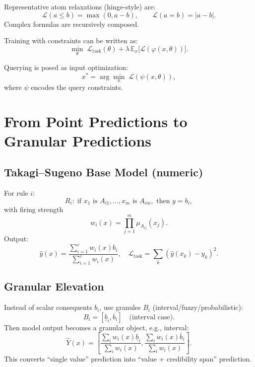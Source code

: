 ﻿\documentclass[11pt,a4paper]{article}
\begin{document}
Representative atom relaxations (hinge-style) are:
\begin{equation}
\mathcal{L}(a \le b)=\max(0,a-b), \qquad
\mathcal{L}(a=b)=|a-b|.
\label{eq:atom_relax}
\end{equation}
Complex formulas are recursively composed.

Training with constraints can be written as:
\begin{equation}
\min_{\theta} \; \mathcal{L}_{\text{task}}(\theta)
+ \lambda\,\mathbb{E}_{x}\big[\mathcal{L}(\varphi(x,\theta))\big].
\label{eq:dl2_train}
\end{equation}

Querying is posed as input optimization:
\begin{equation}
x^{\ast}=\arg\min_{x}\;\mathcal{L}(\psi(x,\theta)),
\label{eq:dl2_query}
\end{equation}
where $\psi$ encodes the query constraints.

\section{From Point Predictions to Granular Predictions}

\subsection{Takagi--Sugeno Base Model (numeric)}
For rule $i$:
\begin{equation}
R_i:\; \text{if }x_1\text{ is }A_{i1},\dots,x_m\text{ is }A_{im},\text{ then } y=b_i,
\label{eq:ts_rule}
\end{equation}
with firing strength
\begin{equation}
w_i(x)=\prod_{j=1}^{m}\mu_{A_{ij}}(x_j).
\label{eq:firing}
\end{equation}
Output:
\begin{equation}
\hat y(x)=\frac{\sum_{i=1}^{c} w_i(x)b_i}{\sum_{i=1}^{c}w_i(x)},
\quad
\mathcal{L}_{\text{task}}=\sum_{k}(\hat y(x_k)-y_k)^2.
\label{eq:ts_output}
\end{equation}

\subsection{Granular Elevation}
Instead of scalar consequents $b_i$, use granules $B_i$ (interval/fuzzy/probabilistic):
\begin{equation}
B_i = [\underline b_i,\overline b_i] \quad \text{(interval case)}.
\label{eq:interval_consequent}
\end{equation}
Then model output becomes a granular object, e.g., interval:
\begin{equation}
\hat Y(x)=\left[
\frac{\sum_i w_i(x)\underline b_i}{\sum_i w_i(x)},
\frac{\sum_i w_i(x)\overline b_i}{\sum_i w_i(x)}
\right].
\label{eq:interval_output}
\end{equation}
This converts ``single value'' prediction into ``value + credibility span'' prediction.
\end{document}
